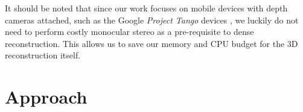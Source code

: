 \documentclass[10pt,twocolumn,letterpaper]{article}
\begin{document}
It should be noted that since our work focuses on mobile devices with depth
cameras attached, such as the Google \emph{Project Tango} devices \cite{Tango}, 
we luckily do not need to perform costly monocular stereo as a pre-requisite to
dense reconstruction. This allows us to save our memory and CPU budget for the
3D reconstruction itself.

\section{Approach} 
\end{document}
